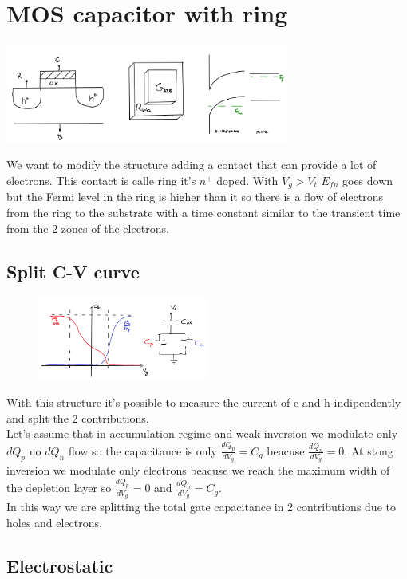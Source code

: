 \section{MOS capacitor with ring}
\centering
\includegraphics[width=0.7\textwidth]{ring.png}\\
\raggedright
We want to modify the structure adding a contact that can provide a lot of electrons. This contact is calle ring it's $n^+$ doped. With $V_g>V_t$ $E_{fn}$ goes down but the Fermi level in the ring is higher than it so there is a flow of electrons from the ring to the substrate with a time constant similar to the transient time from the 2 zones of the electrons.\\

\subsection{Split C-V curve}
\begin{figure}
\includegraphics[width=0.5\textwidth]{splitcv.png}
\end{figure}
With this structure it's possible to measure the current of e and h indipendently and split the 2 contributions.\\
Let's assume that in accumulation regime and weak inversion we modulate only $dQ_p$ no $dQ_n$ flow so the capacitance is only $\frac{dQ_p}{dV_g}=C_g$ beacuse $\frac{dQ_n}{dV_g}=0$.
At stong inversion we modulate only electrons beacuse we reach the maximum width of the depletion layer so $\frac{dQ_p}{dV_g}=0$ and $\frac{dQ_n}{dV_g}=C_g$.\\ In this way we are splitting the total gate capacitance in 2 contributions due to holes and electrons.\\

\subsection{Electrostatic}

